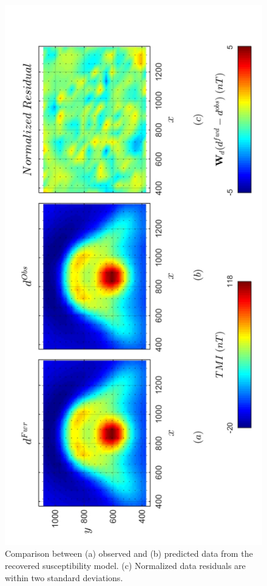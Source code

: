 \begin{figure}[h!]
\centering
\includegraphics[scale=0.52, angle =270]{3D_Inv_l2l2_pred_AMI.pdf}
\caption{ Comparison between (a) observed and (b) predicted data from the recovered susceptibility model. (c) Normalized data residuals are within two standard deviations.}
\label{fig:3D_Inv_l2l2_pred_AMI}
\end{figure}

